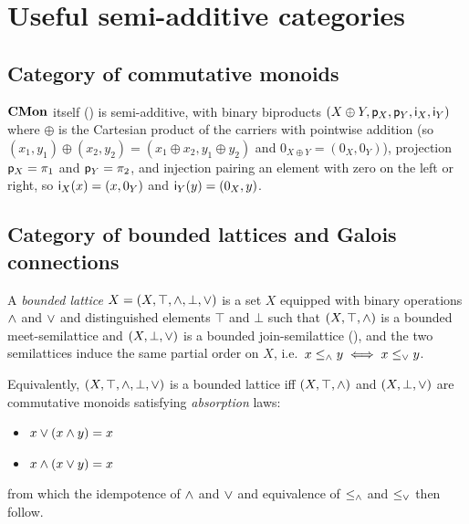 \section{Useful semi-additive categories}
\label{sec:useful-semi-additive-categories}

\subsection{Category of commutative monoids}
\label{sec:categories-with-biproducts:cmon}

$\mathbf{CMon}$ itself () is semi-additive, with binary biproducts $(X \oplus Y, \mathsf{p}_X,
\mathsf{p}_Y, \mathsf{i}_X, \mathsf{i}_Y)$ where $\oplus$ is the Cartesian product of the carriers with pointwise addition
(so $(x_1, y_1) \oplus (x_2, y_2) = (x_1 \oplus x_2, y_1 \oplus y_2)$ and $0_{X \oplus Y} = (0_X, 0_Y)$),
projection $\mathsf{p}_X = \pi_1$ and $\mathsf{p}_Y = \pi_2$, and injection pairing an element with zero on the left
or right, so $\mathsf{i}_X(x) = (x, 0_Y)$ and $\mathsf{i}_Y(y) = (0_X,y)$.

\subsection{Category of bounded lattices and Galois connections}
\label{sec:categories-with-biproducts:latgal}

\begin{definition}
A \emph{bounded lattice} $X = (X, \top, \wedge, \bot, \vee)$ is a set $X$ equipped with binary operations
$\wedge$ and $\vee$ and distinguished elements $\top$ and $\bot$ such that $(X, \top, \wedge)$ is a bounded
meet-semilattice and $(X, \bot, \vee)$ is a bounded join-semilattice
(), and the two semilattices induce the same partial order on $X$,
i.e.~$x \le_{\wedge} y \iff x \le_{\vee} y$.
\end{definition}

\noindent Equivalently, $(X, \top, \wedge, \bot, \vee)$ is a bounded lattice iff $(X, \top, \wedge)$ and $(X,
\bot, \vee)$ are commutative monoids satisfying \emph{absorption} laws:

\begin{itemize}
\item $x \vee (x \wedge y) = x$
\item $x \wedge (x \vee y) = x$
\end{itemize}

\noindent from which the idempotence of $\wedge$ and $\vee$ and equivalence of $\le_{\wedge}$ and $\le_{\vee}$
then follow.

